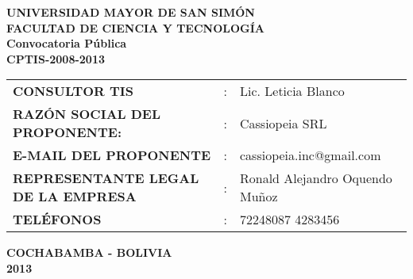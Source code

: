 \documentclass{book}
\begin{document}
\thispagestyle{empty}
\begin{center}
\Large{ \bf{UNIVERSIDAD MAYOR DE SAN SIM\'ON}}
\\
\textbf{FACULTAD DE CIENCIA Y TECNOLOG\'IA}
\\
\vspace{2.8\baselineskip}
\vspace*{0.7cm}
\Large{\bf Convocatoria P\'ublica \\ CPTIS-2008-2013}
\vspace*{5cm}\\
\begin{center}
    \begin{tabular}{lcp{4cm}}
    \textbf{CONSULTOR TIS }&:& Lic. Leticia Blanco \\
    \textbf{RAZ\'ON SOCIAL DEL PROPONENTE: }&:& Cassiopeia SRL\\
    \textbf{E-MAIL DEL PROPONENTE }&:& cassiopeia.inc@gmail.com\\
    \textbf{REPRESENTANTE LEGAL DE LA EMPRESA } &:& Ronald Alejandro Oquendo Mu\~noz\\
    \textbf{TEL\'EFONOS}&:& 72248087 4283456\\
\end{tabular}
\end{center}
\end{center}
\begin{center}
\vspace{2.8\baselineskip}
\vspace*{5.9cm}
\Large{ \bf{COCHABAMBA - BOLIVIA}\hspace*{1cm}\Large{\\2013}}
\end{center}
\thispagestyle{empty}
\end{document}
